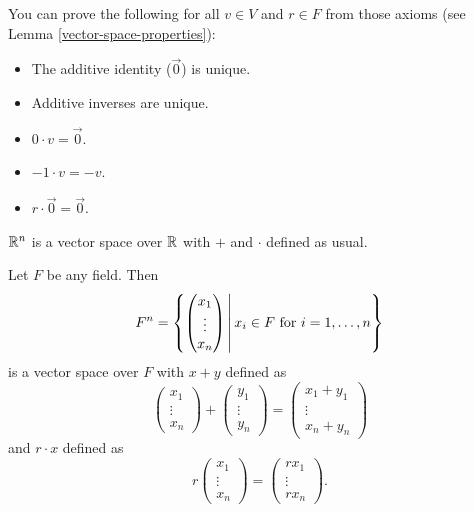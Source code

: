 \begin{rmk}
    You can prove the following for all $v \in V$ and $r \in F$ from those axioms (see Lemma \ref{vector-space-properties}):
    \begin{itemize}
        \item The additive identity ($\vec{0}$) is unique.
        \item Additive inverses are unique.
        \item $0 \cdot v = \vec{0}$.
        \item $-1 \cdot v = -v$.
        \item $r \cdot \vec{0} = \vec{0}$.
    \end{itemize}
\end{rmk}

\begin{exmp}
    $\mathbb{R}^n$ is a vector space over $\mathbb{R}$ with $+$ and $\cdot$ defined as usual.
\end{exmp}

\begin{exmp}
    Let $F$ be any field. Then \[F^n = \left\{\begin{pmatrix}
            x_1 \\ \vdots \\ x_n
        \end{pmatrix} \,\middle|\, x_i \in F \textrm{ for } i = 1, \ldots, n \right\}\] is a vector space over $F$ with $x + y$ defined as \[\begin{pmatrix}
            x_1 \\ \vdots \\ x_n
        \end{pmatrix} + \begin{pmatrix}
            y_1 \\ \vdots \\ y_n
        \end{pmatrix} = \begin{pmatrix}
            x_1 + y_1 \\ \vdots \\ x_n + y_n
        \end{pmatrix}\] and $r \cdot x$ defined as \[r\begin{pmatrix}
            x_1 \\ \vdots \\ x_n
        \end{pmatrix} = \begin{pmatrix}
            rx_1 \\ \vdots \\ rx_n
        \end{pmatrix}.\]
\end{exmp}

